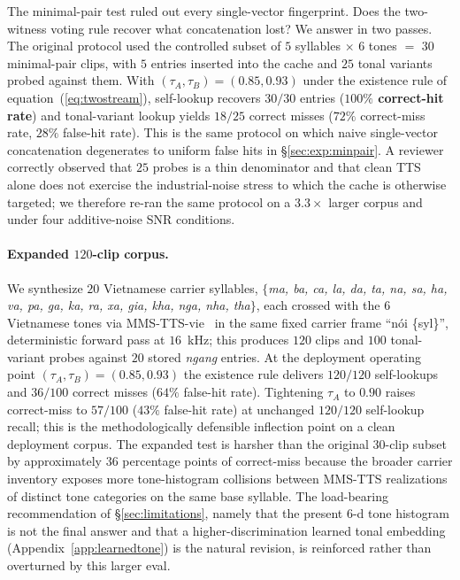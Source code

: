 \documentclass[a4paper,fleqn]{cas-dc}
\begin{document}
The minimal-pair test ruled out every single-vector fingerprint. Does the two-witness voting rule recover what concatenation lost? We answer in two passes. The original protocol used the controlled subset of $5$ syllables $\times$ $6$ tones $=$ $30$ minimal-pair clips, with $5$ entries inserted into the cache and $25$ tonal variants probed against them. With $(\tau_{A}, \tau_{B}) = (0.85, 0.93)$ under the existence rule of equation~(\ref{eq:twostream}), self-lookup recovers $30/30$ entries (\textbf{$100\%$ correct-hit rate}) and tonal-variant lookup yields $18/25$ correct misses ($72\%$ correct-miss rate, $28\%$ false-hit rate). This is the same protocol on which naive single-vector concatenation degenerates to uniform false hits in \S\ref{sec:exp:minpair}. A reviewer correctly observed that $25$ probes is a thin denominator and that clean TTS alone does not exercise the industrial-noise stress to which the cache is otherwise targeted; we therefore re-ran the same protocol on a $3.3\times$ larger corpus and under four additive-noise SNR conditions.

\paragraph{Expanded $120$-clip corpus.} We synthesize $20$ Vietnamese carrier syllables, $\{$\emph{ma, ba, ca, la, da, ta, na, sa, ha, va, pa, ga, ka, ra, xa, gia, kha, nga, nha, tha}$\}$, each crossed with the $6$ Vietnamese tones via MMS-TTS-vie~\citep{pratap2024mms} in the same fixed carrier frame ``n\'oi \{syl\}'', deterministic forward pass at $16$~kHz; this produces $120$ clips and $100$ tonal-variant probes against $20$ stored \emph{ngang} entries. At the deployment operating point $(\tau_{A}, \tau_{B}) = (0.85, 0.93)$ the existence rule delivers $120/120$ self-lookups and $36/100$ correct misses ($64\%$ false-hit rate). Tightening $\tau_{A}$ to $0.90$ raises correct-miss to $57/100$ ($43\%$ false-hit rate) at unchanged $120/120$ self-lookup recall; this is the methodologically defensible inflection point on a clean deployment corpus. The expanded test is harsher than the original $30$-clip subset by approximately $36$ percentage points of correct-miss because the broader carrier inventory exposes more tone-histogram collisions between MMS-TTS realizations of distinct tone categories on the same base syllable. The load-bearing recommendation of \S\ref{sec:limitations}, namely that the present 6-d tone histogram is not the final answer and that a higher-discrimination learned tonal embedding (Appendix~\ref{app:learnedtone}) is the natural revision, is reinforced rather than overturned by this larger eval.
\end{document}
